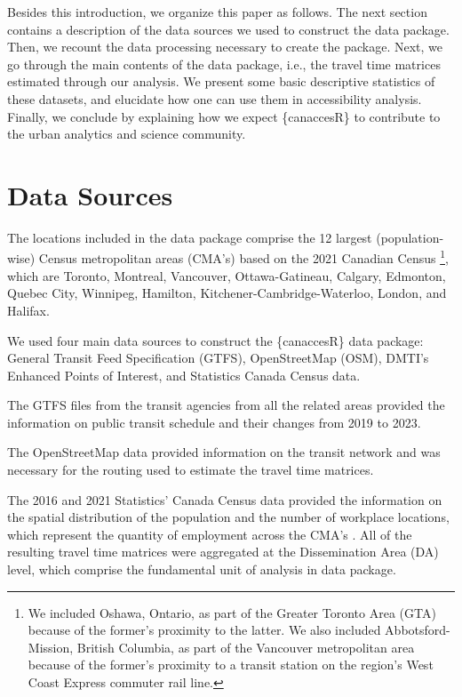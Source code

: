 \documentclass[Royal,times,sageh]{sagej}
\begin{document}
Besides this introduction, we organize this paper as follows. The next
section contains a description of the data sources we used to construct
the data package. Then, we recount the data processing necessary to
create the package. Next, we go through the main contents of the data
package, i.e., the travel time matrices estimated through our analysis.
We present some basic descriptive statistics of these datasets, and
elucidate how one can use them in accessibility analysis. Finally, we
conclude by explaining how we expect \{canaccesR\} to contribute to the
urban analytics and science community.

\section{Data Sources}\label{data-sources}

The locations included in the data package comprise the 12 largest
(population-wise) Census metropolitan areas (CMA's) based on the 2021
Canadian Census \citep{governmentofcanada2021CensusPopulation2021}
\footnote{We included Oshawa, Ontario, as part of the Greater Toronto
  Area (GTA) because of the former's proximity to the latter. We also
  included Abbotsford-Mission, British Columbia, as part of the
  Vancouver metropolitan area because of the former's proximity to a
  transit station on the region's West Coast Express commuter rail line.},
which are Toronto, Montreal, Vancouver, Ottawa-Gatineau, Calgary,
Edmonton, Quebec City, Winnipeg, Hamilton, Kitchener-Cambridge-Waterloo,
London, and Halifax.

We used four main data sources to construct the \{canaccesR\} data
package: General Transit Feed Specification (GTFS), OpenStreetMap (OSM),
DMTI's Enhanced Points of Interest, and Statistics Canada Census data.

The GTFS files from the transit agencies from all the related areas
provided the information on public transit schedule and their changes
from 2019 to 2023.

The OpenStreetMap data provided information on the transit network and
was necessary for the routing used to estimate the travel time matrices.

The 2016 and 2021 Statistics' Canada Census data provided the
information on the spatial distribution of the population and the number
of workplace locations, which represent the quantity of employment
across the CMA's
\citep[governmentofcanada2021CensusPopulation2021]{governmentofcanada2016CensusPopulation2016}.
All of the resulting travel time matrices were aggregated at the
Dissemination Area (DA) level, which comprise the fundamental unit of
analysis in data package.
\end{document}

